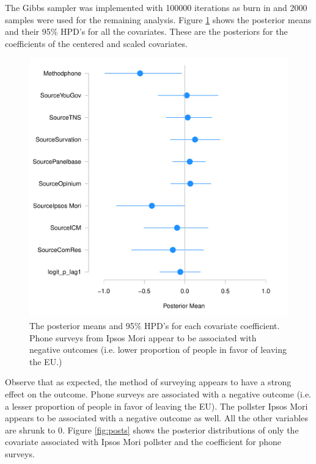 \documentclass{../../tex_template/asaproc}
\begin{document}
The Gibbs sampler was implemented with 100000 iterations as burn in and 2000
samples were used for the remaining analysis. Figure \ref{fig:allposts} shows
the posterior means and their 95\% HPD's for all the covariates. 
These are the posteriors for the coefficients of the centered and scaled covariates. 
\begin{figure}[H]
  \includegraphics[scale=.5]{figs/allposts.pdf}
  \caption{\small The posterior means and 95\% HPD's for each covariate coefficient.
  Phone surveys from Ipsos Mori appear to be associated with negative outcomes (i.e.
  lower proportion of people in favor of leaving the EU.)}
  \label{fig:allposts}
\end{figure}
Observe that as expected, the method of surveying appears to have a strong effect on
the outcome. Phone surveys are associated with a negative outcome (i.e. a lesser
proportion of people in favor of leaving the EU). The pollster Ipsos Mori
appears to be associated with a negative outcome as well. All the other variables 
are shrunk to 0. Figure \ref{fig:posts} shows the posterior distributions of
only the covariate associated with Ipsos Mori pollster and the coefficient for
phone surveys.
\end{document}
